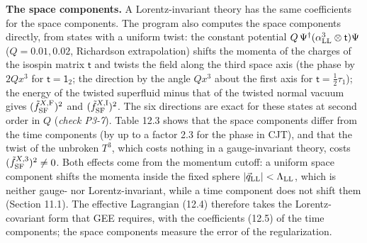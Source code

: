 \documentclass[
  10pt,
]{article}
\begin{document}
\textbf{The space components.} A Lorentz-invariant theory has the same
coefficients for the space components. The program also computes the
space components directly, from states with a uniform twist: the
constant potential
\(Q\,\Psi^\dagger(\alpha^3_{\rm LL}\otimes\mathsf t)\Psi\)
(\(Q=0.01,0.02\), Richardson extrapolation) shifts the momenta of the
charges of the isospin matrix \(\mathsf t\) and twists the field along
the third space axis (the phase by \(2Qx^3\) for
\(\mathsf t=\mathsf 1_2\); the direction by the angle \(Qx^3\) about the
first axis for \(\mathsf t=\tfrac12\tau_1\)); the energy of the twisted
superfluid minus that of the twisted normal vacuum gives
\((\tilde f^{X,{\rm F}}_{\rm SF})^2\) and
\((\tilde f^{X,{\rm I}}_{\rm SF})^2\). The six directions are exact for
these states at second order in \(Q\) (\emph{check P3-7}). Table 12.3
shows that the space components differ from the time components (by up
to a factor 2.3 for the phase in CJT), and that the twist of the
unbroken \(T^3\), which costs nothing in a gauge-invariant theory, costs
\((\tilde f^{X,3}_{\rm SF})^2\neq0\). Both effects come from the
momentum cutoff: a uniform space component shifts the momenta inside the
fixed sphere \(\lvert\vec q_{\rm LL}\rvert<\Lambda_{\rm LL}\), which is
neither gauge- nor Lorentz-invariant, while a time component does not
shift them (Section 11.1). The effective Lagrangian (12.4) therefore
takes the Lorentz-covariant form that GEE requires, with the
coefficients (12.5) of the time components; the space components measure
the error of the regularization.
\end{document}
